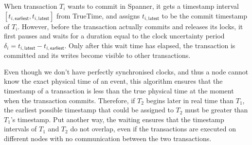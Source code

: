 \begin{frame}
\end{frame}
\label{l:truetime}

When transaction $T_i$ wants to commit in Spanner, it gets a timestamp interval $[t_{i,\mathsf{earliest}}, t_{i,\mathsf{latest}}]$ from TrueTime, and assigns $t_{i,\mathsf{latest}}$ to be the commit timestamp of $T_i$.
However, before the transaction actually commits and releases its locks, it first pauses and waits for a duration equal to the clock uncertainty period $\delta_i = t_{i,\mathsf{latest}} - t_{i,\mathsf{earliest}}$.
Only after this wait time has elapsed, the transaction is committed and its writes become visible to other transactions.

Even though we don't have perfectly synchronised clocks, and thus a node cannot know the exact physical time of an event, this algorithm ensures that the timestamp of a transaction is less than the true physical time at the moment when the transaction commits.
Therefore, if $T_2$ begins later in real time than $T_1$, the earliest possible timestamp that could be assigned to $T_2$ must be greater than $T_1$'s timestamp.
Put another way, the waiting ensures that the timestamp intervals of $T_1$ and $T_2$ do not overlap, even if the transactions are executed on different nodes with no communication between the two transactions.

